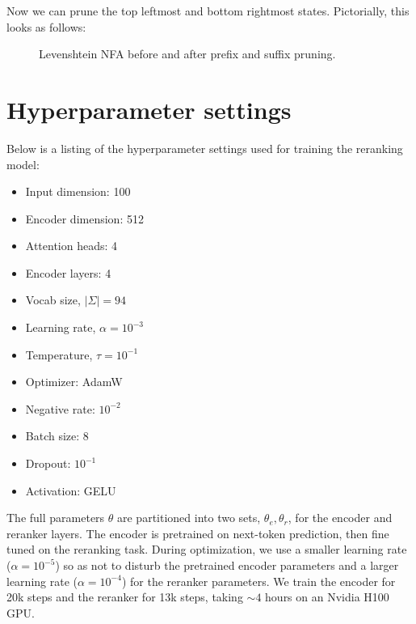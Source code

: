 \documentclass[sigplan,review,acmsmall,nonacm,screen,anonymous]{acmart}\settopmatter{printfolios=false,printccs=false,printacmref=false}
\begin{document}
\noindent Now we can prune the top leftmost and bottom rightmost states. Pictorially, this looks as follows:

\begin{figure}[H]
  \resizebox{0.47\textwidth}{!}{
    
  }
  \resizebox{0.47\textwidth}{!}{
    
  }
  \caption{Levenshtein NFA before and after prefix and suffix pruning.}
\end{figure}\vspace{-0.175cm}

\section{Hyperparameter settings}\label{sec:hyperparams}

Below is a listing of the hyperparameter settings used for training the reranking model:

\begin{multicols}{3}
\begin{itemize}
\item Input dimension: 100
\item Encoder dimension: 512
\item Attention heads: 4
\item Encoder layers: 4
\item Vocab size, $|\Sigma|= 94$
\item Learning rate, $\alpha= 10^{-3}$
\item Temperature, $\tau= 10^{-1}$
\item Optimizer: AdamW
\item Negative rate: $10^{-2}$
\item Batch size: 8
\item Dropout: $10^{-1}$
\item Activation: GELU
\end{itemize}
\end{multicols}

The full parameters $\theta$ are partitioned into two sets, $\theta_e, \theta_r$, for the encoder and reranker layers. The encoder is pretrained on next-token prediction, then fine tuned on the reranking task. During optimization, we use a smaller learning rate ($\alpha = 10^{-5}$) so as not to disturb the pretrained encoder parameters and a larger learning rate ($\alpha = 10^{-4}$) for the reranker parameters. We train the encoder for 20k steps and the reranker for 13k steps, taking $\sim 4$ hours on an Nvidia H100 GPU.
\end{document}
